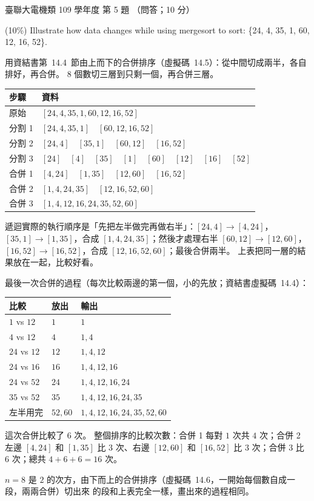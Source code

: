 \begin{pastexam}[label={px:ust-109-ee-ds-05}]{臺聯大電機類 109 學年度 第 5 題}
（問答；10 分）

(10\%) Illustrate how data changes while using mergesort to sort: \{24, 4, 35, 1, 60, 12, 16, 52\}.
\end{pastexam}

\begin{pastsoln}
用資結書第~14.4~節由上而下的合併排序（虛擬碼~14.5）：從中間切成兩半，各自排好，再合併。
$8$ 個數切三層到只剩一個，再合併三層。

\begin{center}
\small
\begin{tabular}{ll}
\toprule
步驟 & 資料 \\
\midrule
原始 & $[24, 4, 35, 1, 60, 12, 16, 52]$ \\
分割 1 & $[24, 4, 35, 1]\quad[60, 12, 16, 52]$ \\
分割 2 & $[24, 4]\quad[35, 1]\quad[60, 12]\quad[16, 52]$ \\
分割 3 & $[24]\quad[4]\quad[35]\quad[1]\quad[60]\quad[12]\quad[16]\quad[52]$ \\
\midrule
合併 1 & $[4, 24]\quad[1, 35]\quad[12, 60]\quad[16, 52]$ \\
合併 2 & $[1, 4, 24, 35]\quad[12, 16, 52, 60]$ \\
合併 3 & $[1, 4, 12, 16, 24, 35, 52, 60]$ \\
\bottomrule
\end{tabular}
\end{center}

遞迴實際的執行順序是「先把左半做完再做右半」：$[24,4]\to[4,24]$，$[35,1]\to[1,35]$，合成
$[1,4,24,35]$；然後才處理右半 $[60,12]\to[12,60]$，$[16,52]\to[16,52]$，合成
$[12,16,52,60]$；最後合併兩半。 上表把同一層的結果放在一起，比較好看。

最後一次合併的過程（每次比較兩邊的第一個，小的先放；資結書虛擬碼~14.4）：
\begin{center}
\small
\begin{tabular}{lll}
\toprule
比較 & 放出 & 輸出 \\
\midrule
$1$ vs $12$ & $1$ & $1$ \\
$4$ vs $12$ & $4$ & $1, 4$ \\
$24$ vs $12$ & $12$ & $1, 4, 12$ \\
$24$ vs $16$ & $16$ & $1, 4, 12, 16$ \\
$24$ vs $52$ & $24$ & $1, 4, 12, 16, 24$ \\
$35$ vs $52$ & $35$ & $1, 4, 12, 16, 24, 35$ \\
左半用完 & $52, 60$ & $1, 4, 12, 16, 24, 35, 52, 60$ \\
\bottomrule
\end{tabular}
\end{center}
這次合併比較了 $6$ 次。 整個排序的比較次數：合併 1 每對 $1$ 次共 $4$ 次；合併 2 左邊
$[4,24]$ 和 $[1,35]$ 比 $3$ 次、右邊 $[12,60]$ 和 $[16,52]$ 比 $3$ 次；合併 3 比 $6$ 次；總共
$4 + 6 + 6 = 16$ 次。

$n = 8$ 是 $2$ 的次方，由下而上的合併排序（虛擬碼~14.6，一開始每個數自成一段，兩兩合併）切出來
的段和上表完全一樣，畫出來的過程相同。
\end{pastsoln}
